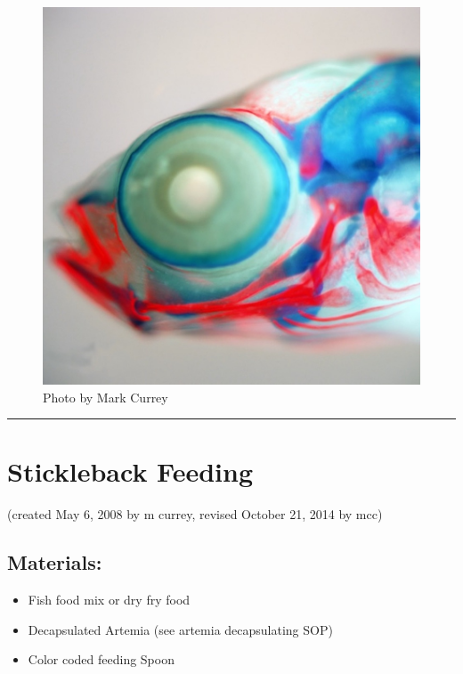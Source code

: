 \documentclass[
]{book}
\providecommand{\tightlist}{%
  \setlength{\itemsep}{0pt}\setlength{\parskip}{0pt}}
\begin{document}
\begin{figure}
\centering
\includegraphics{images/double_head.jpg}
\caption{Photo by Mark Currey}
\end{figure}

\begin{center}\rule{0.5\linewidth}{0.5pt}\end{center}

\hypertarget{stickleback-feeding}{%
\section{Stickleback Feeding}\label{stickleback-feeding}}

(created May 6, 2008 by m currey, revised October 21, 2014 by mcc)

\hypertarget{materials}{%
\subsection{Materials:}\label{materials}}

\begin{itemize}
\tightlist
\item
  Fish food mix or dry fry food
\item
  Decapsulated Artemia (see artemia decapsulating SOP)
\item
  Color coded feeding Spoon
\end{itemize}
\end{document}
